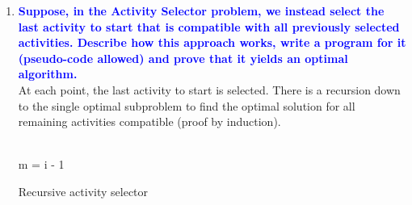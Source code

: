 \documentclass[11pt]{article}
\begin{document}
\begin{enumerate}
\item  \textbf{\textcolor{blue}{Suppose, in the Activity Selector problem, we
instead select the last activity to start that is compatible with all previously
selected activities. Describe how this approach works, write a program for it 
(pseudo-code allowed) and prove that it yields an optimal algorithm.}}
    \\ At each point, the last activity to start is selected. There is a recursion down to the single optimal subproblem to find the optimal solution for all remaining activities compatible (proof by induction). \\
    \begin{algorithm}
    \Indm{}\\
    \Indp
        m = i - 1 \\
    \caption{Recursive activity selector}
    \end{algorithm}
    

\end{enumerate}
\end{document}
